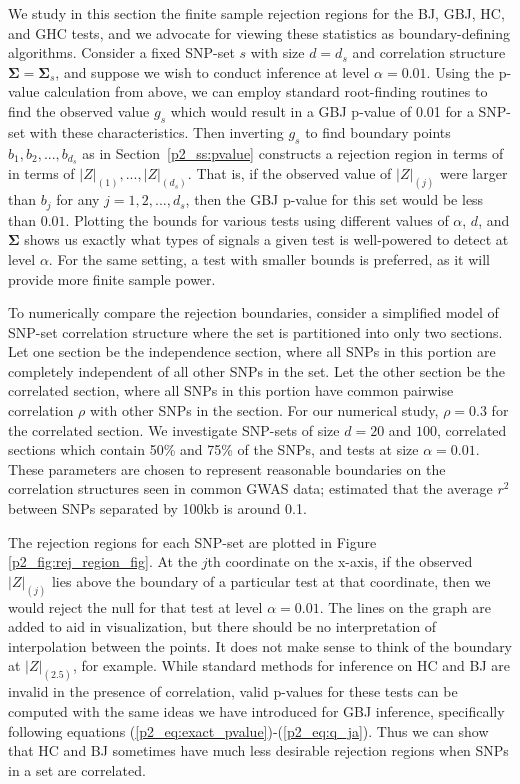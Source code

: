 \documentclass[12pt]{article}
\begin{document}
We study in this section the finite sample rejection regions for the BJ, GBJ, HC, and GHC tests,
and we advocate for viewing these statistics as boundary-defining algorithms. 
Consider a fixed SNP-set $s$ with size $d=d_{s}$ and correlation structure $\mathbf{\Sigma}=\mathbf{\Sigma}_{s}$, and 
suppose we wish to conduct inference at level $\alpha=0.01$. 
Using the p-value calculation from above, we can employ standard 
root-finding routines to find the observed value $g_{s}$ which 
would result in a GBJ p-value of 0.01 for a SNP-set with these characteristics.
Then inverting $g_{s}$ to find boundary points $b_{1},b_{2},...,b_{d_{s}}$
as in Section~\ref{p2_ss:pvalue} constructs a rejection region in terms of in terms of $|Z|_{(1)},...,|Z|_{(d_{s})}$.
That is, if the observed value of $|Z|_{(j)}$ were larger than $b_{j}$ for any $j=1,2,...,d_{s}$, then the 
GBJ p-value for this set would be less than $0.01$.
Plotting the bounds for various tests using different values of $\alpha$, $d$, and $\boldsymbol{\Sigma}$
shows us exactly what types of signals a given test is well-powered to detect at 
level $\alpha$.
For the same setting, a test with smaller bounds is preferred, as it will provide more
finite sample power.


To numerically compare the rejection boundaries, consider a simplified model of SNP-set correlation
structure where the set is partitioned into only two sections. 
Let one section be the independence section, where all SNPs in this portion
are completely independent of all other SNPs in the set.  
Let the other section be the correlated section, where all SNPs in this portion
have common pairwise correlation $\rho$ with other SNPs in the section.
For our numerical study, $\rho=0.3$ for the correlated section.
We investigate SNP-sets of size $d=20$ and $100$,
correlated sections which contain 50\% and 75\% of the SNPs,
and tests at size $\alpha=0.01$. 
These parameters are chosen to represent reasonable boundaries on the correlation structures seen 
in common GWAS data; \citet{Dawson_LD} estimated that the average $r^{2}$ between 
SNPs separated by 100kb is around 0.1.


The rejection regions for each SNP-set are plotted in Figure \ref{p2_fig:rej_region_fig}. 
At the $j$th coordinate on the x-axis, if the observed $|Z|_{(j)}$ lies above the boundary
of a particular test at that coordinate, then we would reject the
null for that test at level $\alpha=0.01$. 
The lines on the graph are added to aid in visualization, but there should 
be no interpretation of interpolation between the points. 
It does not make sense to think of the boundary at $|Z|_{(2.5)}$, for example.
While standard methods for inference on HC and BJ are invalid in the presence of
correlation, valid p-values for these tests can be computed with the same ideas
we have introduced for GBJ inference, specifically following equations (\ref{p2_eq:exact_pvalue})-(\ref{p2_eq:q_ja}).
Thus we can show that HC and BJ sometimes have much less desirable 
rejection regions when SNPs in a set are correlated.
\end{document}
